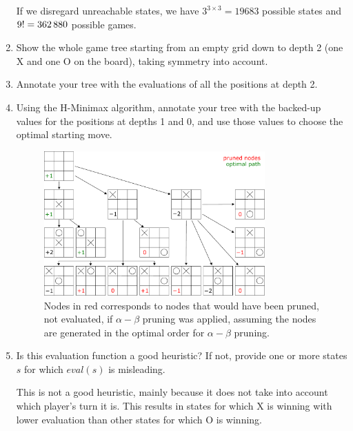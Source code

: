\documentclass[11pt, a4paper]{article}
\begin{document}
\begin{enumerate}
    \begin{solution}
        If we disregard unreachable states, we have $3^{3 \times 3} = \num{19683}$ possible states and $9! = \num{362880}$ possible games.
    \end{solution}

    \item Show the whole game tree starting from an empty grid down to depth 2 (one X and one O on the board), taking symmetry into account.
    \item Annotate your tree with the evaluations of all the positions at depth 2.
    \item Using the H-Minimax algorithm, annotate your tree with the backed-up values for the positions at depths 1 and 0, and use those values to choose the optimal starting move.

    \begin{solution}
        \begin{figure}[H]
            \centering
            \includegraphics[width=0.8\textwidth]{figures/e2_tictactoe.pdf}
            \caption{Nodes in red corresponds to nodes that would have been pruned, \ie{} not evaluated, if $\alpha - \beta$ pruning was applied, assuming the nodes are generated in the optimal order for $\alpha - \beta$ pruning.}
        \end{figure}
    \end{solution}

    \item Is this evaluation function a good heuristic? If not, provide one or more states $s$ for which $eval(s)$ is misleading.

    \begin{solution}
        This is not a good heuristic, mainly because it does not take into account which player's turn it is. This results in states for which X is winning with lower evaluation than other states for which O is winning.


\end{solution}
\end{enumerate}
\end{document}
